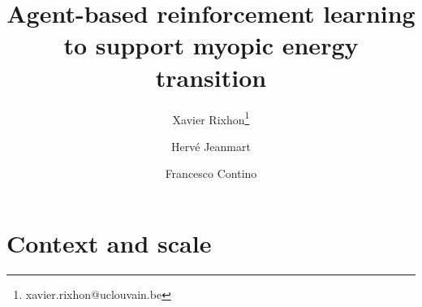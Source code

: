 \documentclass[11pt,twoside,a4paper,english]{article}
\begin{document}
\begin{titlepage}


\title{Agent-based reinforcement learning to support myopic energy transition}

\author[1]{Xavier Rixhon\thanks{xavier.rixhon@uclouvain.be}}
\author[1]{Hervé Jeanmart}
\author[1]{Francesco Contino}







\date{} %
{\let\newpage\relax\maketitle}

\tableofcontents
\printglossaries

\end{titlepage}



\section{Context and scale}
\end{document}
